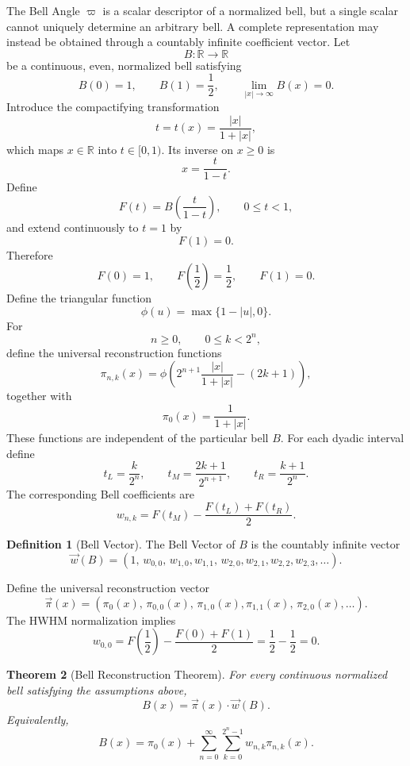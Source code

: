 \documentclass[11pt]{article}
\theoremstyle{definition}
\newtheorem{definition}{Definition}[section]
\theoremstyle{plain}
\newtheorem{theorem}[definition]{Theorem}
\theoremstyle{remark}
\begin{document}
The Bell Angle $\varpi$ is a scalar descriptor of a normalized bell, but a single scalar cannot uniquely determine an arbitrary bell. A complete representation may instead be obtained through a countably infinite coefficient vector.
Let
\[
B:\mathbb{R}\to\mathbb{R}
\]
be a continuous, even, normalized bell satisfying
\[
B(0)=1,
\qquad
B(1)=\frac12,
\qquad
\lim_{|x|\to\infty}B(x)=0.
\]
Introduce the compactifying transformation
\[
t=t(x)=\frac{|x|}{1+|x|},
\]
which maps $x\in\mathbb{R}$ into $t\in[0,1)$. Its inverse on $x\ge 0$ is
\[
x=\frac{t}{1-t}.
\]
Define
\[
F(t)=B\!\left(\frac{t}{1-t}\right),
\qquad 0\le t<1,
\]
and extend continuously to $t=1$ by
\[
F(1)=0.
\]
Therefore
\[
F(0)=1,
\qquad
F\!\left(\frac12\right)=\frac12,
\qquad
F(1)=0.
\]
Define the triangular function
\[
\phi(u)=\max\{1-|u|,0\}.
\]
For
\[
n\ge 0,
\qquad
0\le k<2^n,
\]
define the universal reconstruction functions
\[
\pi_{n,k}(x)
=
\phi\!\left(
2^{n+1}\frac{|x|}{1+|x|}
-(2k+1)
\right),
\]
together with
\[
\pi_0(x)=\frac{1}{1+|x|}.
\]
These functions are independent of the particular bell $B$.
For each dyadic interval define
\[
t_L=\frac{k}{2^n},
\qquad
t_M=\frac{2k+1}{2^{n+1}},
\qquad
t_R=\frac{k+1}{2^n}.
\]
The corresponding Bell coefficients are
\[
w_{n,k}
=
F(t_M)
-
\frac{F(t_L)+F(t_R)}{2}.
\]
\begin{definition}[Bell Vector]\label{def:bellvector}
The Bell Vector of $B$ is the countably infinite vector
\[
\boxed{
\vec{w}(B)
=
\left(
1,\,
w_{0,0},\,
w_{1,0},w_{1,1},\,
w_{2,0},w_{2,1},w_{2,2},w_{2,3},
\ldots
\right).
}
\]
\end{definition}
Define the universal reconstruction vector
\[
\boxed{
\vec{\pi}(x)
=
\left(
\pi_0(x),\,
\pi_{0,0}(x),\,
\pi_{1,0}(x),\pi_{1,1}(x),\,
\pi_{2,0}(x),\ldots
\right).
}
\]
The HWHM normalization implies
\[
w_{0,0}
=
F\!\left(\frac12\right)
-
\frac{F(0)+F(1)}{2}
=
\frac12-\frac12
=
0.
\]
\begin{theorem}[Bell Reconstruction Theorem]\label{thm:bellreconstruction}
For every continuous normalized bell satisfying the assumptions above,
\[
\boxed{
B(x)=\vec{\pi}(x)\cdot\vec{w}(B).
}
\]
Equivalently,
\[
\boxed{
B(x)
=
\pi_0(x)
+
\sum_{n=0}^{\infty}
\sum_{k=0}^{2^n-1}
w_{n,k}\pi_{n,k}(x).
}
\]
\end{theorem}
\end{document}
